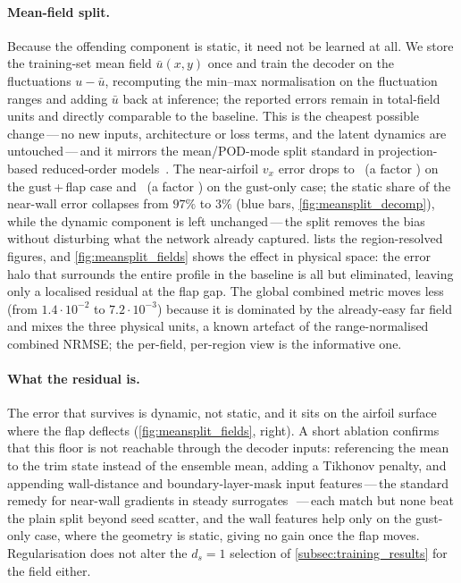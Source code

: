 \paragraph{Mean-field split.} Because the offending component is static, it need not be
learned at all. We store the training-set mean field $\bar{u}(x,y)$ once and train the
decoder on the fluctuations $u-\bar{u}$, recomputing the min--max normalisation on the
fluctuation ranges and adding $\bar{u}$ back at inference; the reported errors remain in
total-field units and directly comparable to the baseline. This is the cheapest possible
change\,---\,no new inputs, architecture or loss terms, and the latent dynamics are
untouched\,---\,and it mirrors the mean/POD-mode split standard in projection-based
reduced-order models~\cite{BennerGugercinWillcox2015}. The near-airfoil $v_x$ error drops to
\msCcMsNear\ (a factor \msCcFactor) on the gust\,+\,flap case and \msAMsNear\ (a factor
\msAFactor) on the gust-only case; the static share of the near-wall error collapses
from $97\%$ to $3\%$ (blue bars, \cref{fig:meansplit_decomp}), while the dynamic
component is left unchanged\,---\,the split removes the bias without disturbing what the
network already captured.  lists the region-resolved figures, and
\cref{fig:meansplit_fields} shows the effect in physical space: the error halo that
surrounds the entire profile in the baseline is all but eliminated, leaving only a
localised residual at the flap gap. The global combined metric moves less (from
$1.4\cdot10^{-2}$ to $7.2\cdot10^{-3}$) because it is dominated by the already-easy
far field and mixes the three physical units, a known artefact of the range-normalised
combined NRMSE; the per-field, per-region view is the informative one.

\paragraph{What the residual is.} The error that survives is dynamic, not static, and it
sits on the airfoil surface where the flap deflects (\cref{fig:meansplit_fields}, right).
A short ablation confirms that this floor is not reachable through the decoder inputs:
referencing the mean to the trim state instead of the ensemble mean, adding a
Tikhonov penalty, and appending wall-distance and boundary-layer-mask input
features\,---\,the standard remedy for near-wall gradients in steady
surrogates~\cite{Catalani2025}\,---\,each match but none beat the plain split beyond
seed scatter, and the wall features help only on the gust-only case, where the geometry
is static, giving no gain once the flap moves. Regularisation does not alter the
$d_s=1$ selection of \cref{subsec:training_results} for the field either.

